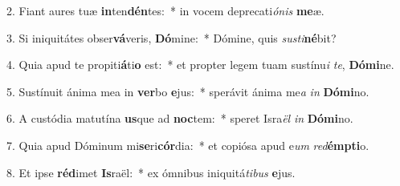 2. Fiant aures tuæ \textbf{in}ten\textbf{dén}tes:~*  in vocem deprecati\textit{ó}\textit{nis} \textbf{me}æ.\

3. Si iniquitátes obser\textbf{vá}veris, \textbf{Dó}mine:~*  Dómine, quis \textit{sus}\textit{ti}\textbf{né}bit?\

4. Quia apud te propiti\textbf{á}ti\textbf{o} est:~*  et propter legem tuam sustínu\textit{i} \textit{te}, \textbf{Dó}\textbf{mi}ne.\

5. Sustínuit ánima mea in \textbf{ver}bo \textbf{e}jus:~*  sperávit ánima me\textit{a} \textit{in} \textbf{Dó}\textbf{mi}no.\

6. A custódia matutína \textbf{us}que ad \textbf{noc}tem:~*  speret Isra\textit{ël} \textit{in} \textbf{Dó}\textbf{mi}no.\

7. Quia apud Dóminum mi\textbf{se}ri\textbf{cór}dia:~*  et copiósa apud e\textit{um} \textit{red}\textbf{émp}\textbf{ti}o.\

8. Et ipse \textbf{réd}imet \textbf{Is}raël:~*  ex ómnibus iniquitá\textit{ti}\textit{bus} \textbf{e}jus.\

